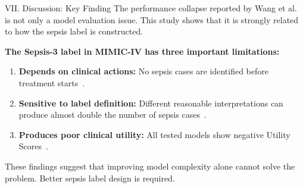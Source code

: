 \begin{frame}{VII. Discussion: Key Finding}
The performance collapse reported by Wang et al.~\cite{wang2025srpm} is not
only a model evaluation issue. This study shows that it is strongly related
to how the sepsis label is constructed.

\vspace{6pt}
\textbf{The Sepsis-3 label in MIMIC-IV has three important limitations:}
\begin{enumerate}
  \item \textbf{Depends on clinical actions:} No sepsis cases are
        identified before treatment starts~\cite{kamran2024evaluation}.
  \item \textbf{Sensitive to label definition:} Different reasonable
        interpretations can produce almost double the number of sepsis
        cases~\cite{cohen2024subtle}.
  \item \textbf{Produces poor clinical utility:} All tested models show
        negative Utility Scores~\cite{wang2025srpm}.
\end{enumerate}

\vspace{6pt}
\begin{alertblock}{}
  \centering These findings suggest that improving model complexity alone
  cannot solve the problem. Better sepsis label design is required.
\end{alertblock}
\end{frame}



